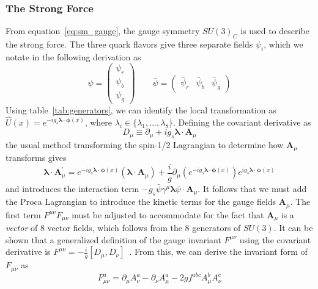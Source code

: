 \subsubsection{The Strong Force} \label{sec:sm_theory_strong}
From equation~\ref{eq:sm_gauge}, the gauge symmetry $SU(3)_C$ is used to describe the strong force. The three quark flavors give three separate fields $\psi_i$, which we notate in the following derivation as
\begin{equation}
	\psi=\begin{pmatrix}\psi_r\\ \psi_b \\ \psi_g\end{pmatrix} \qquad \bar{\psi}=\begin{pmatrix}\bar{\psi}_r & \bar{\psi}_b & \bar{\psi}_g\end{pmatrix}
\end{equation}
Using table~\ref{tab:generators}, we can identify the local transformation as $\hat{U}(x)=e^{-ig_s\boldsymbol{\lambda}\cdot\boldsymbol{\phi}(x)}$, where $\lambda_i\in\{\lambda_1,...,\lambda_8\}$. Defining the covariant derivative as
\begin{equation}
	D_\mu\equiv\partial_\mu+ig_s\boldsymbol{\lambda}\cdot \mathbf{A}_\mu
\end{equation}
the usual method transforming the spin-1/2 Lagrangian to determine how $\mathbf{A}_\mu$ transforms gives
\begin{equation}
	\boldsymbol{\lambda}\cdot\mathbf{A}^\prime_\mu=e^{-ig_s\boldsymbol{\lambda}\cdot\boldsymbol{\phi}(x)}\left(\boldsymbol{\lambda}\cdot\mathbf{A}_\mu\right)+\frac{i}{g}\partial_\mu\left(e^{-ig_s\boldsymbol{\lambda}\cdot\boldsymbol{\phi}(x)}\right)e^{ig_s\boldsymbol{\lambda}\cdot\boldsymbol{\phi}(x)}
\end{equation}
and introduces the interaction term $-g_s\bar{\psi}\gamma^\mu\boldsymbol{\lambda}\psi\cdot\mathbf{A}_\mu$. It follows that we must add the Proca Lagrangian to introduce the kinetic terms for the gauge fields $\mathbf{A}_\mu$. The first term $F^{\mu\nu}F_{\mu\nu}$ must be adjusted to accommodate for the fact that $\mathbf{A}_\mu$ is a \textit{vector} of 8 vector fields, which follows from the 8 generators of $SU(3)$. It can be shown that a generalized definition of the gauge invariant $F^{\mu\nu}$ using the covariant derivative is $F^{\mu\nu}=-\frac{i}{g}[D_\mu,D_\nu]$~\cite{flournoy}. From this, we can derive the invariant form of $F_{\mu\nu}$ as
\begin{equation}
	\label{eq:qcd_fmunu}
	F_{\mu\nu}^a=\partial_\mu A^a_\nu-\partial_\nu A^a_\mu-2gf^{abc}A^b_\mu A^c_\nu
\end{equation}

